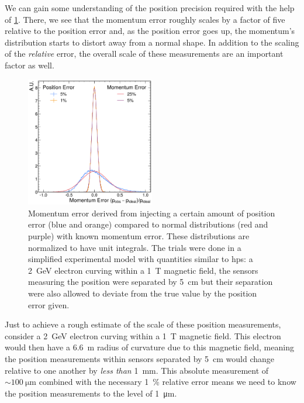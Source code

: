 We can gain some understanding of the position precision required with the help of
\cref{fig:momentum-error-from-position-error}.
There, we see that the momentum error roughly scales by a factor of five relative to
the position error and, as the position error goes up,
the momentum's distribution starts to distort away from a normal shape.
In addition to the scaling of the \emph{relative} error, the overall scale of these
measurements are an important factor as well.

\begin{figure}
	\centering
	\includegraphics[width=0.5\textwidth]{one-offs/position-momentum-uncertainty/momentum-error-from-position-error.pdf}
	\caption{
		Momentum error derived from injecting a certain amount of position error
		(blue and orange) compared to normal distributions (red and purple)
		with known momentum error.
		These distributions are normalized to have unit integrals.
		The trials were done in a simplified experimental model with quantities
		similar to \ac{hps}: a \qty{2}{\giga\electronvolt} electron curving within a
		\qty{1}{\tesla} magnetic field, the sensors measuring the position were
		separated by \qty{5}{\centi\meter} but their separation were also allowed to
		deviate from the true value by the position error given.
	}
	\label{fig:momentum-error-from-position-error}
\end{figure}

Just to achieve a rough estimate of the scale of these position measurements,
consider a \qty{2}{\giga\electronvolt} electron curving within a \qty{1}{\tesla}
magnetic field.
This electron would then have a \qty{6.6}{\meter} radius of curvature
due to this magnetic field, meaning the position measurements within
sensors separated by \qty{5}{\centi\meter} would change relative to one another
by \emph{less than} \qty{1}{\milli\meter}.
This absolute measurement of $\sim\qty{100}{\micro\meter}$ combined with the
necessary \qty{1}{\percent} relative error means we need to know the position
measurements to the level of \qty{1}{\micro\meter}.

